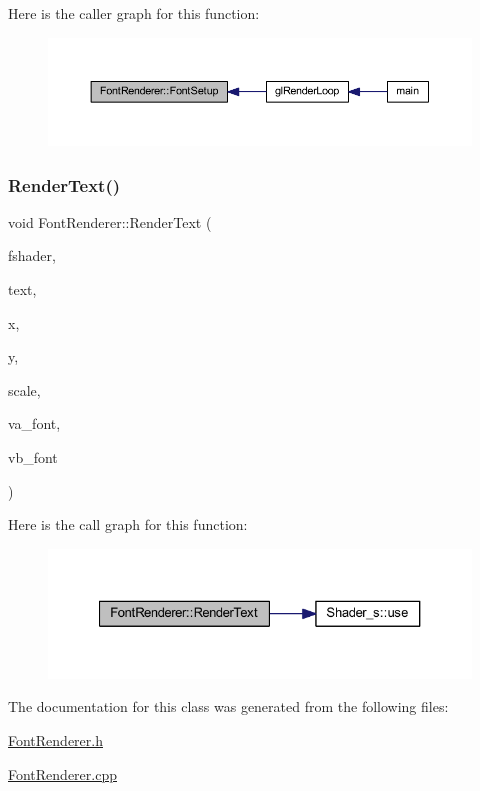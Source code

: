Here is the caller graph for this function\+:
\nopagebreak
\begin{figure}[H]
\begin{center}
\leavevmode
\includegraphics[width=350pt]{class_font_renderer_aa53dc1273b15862d310a4bc66817a5d5_icgraph}
\end{center}
\end{figure}
\mbox{\label{class_font_renderer_adaedb69de45aa987661d83539b0d4ed8}} 
\subsubsection{\texorpdfstring{Render\+Text()}{RenderText()}}
{\footnotesize\ttfamily void Font\+Renderer\+::\+Render\+Text (\begin{DoxyParamCaption}\item[{\mbox{\hyperlink{class_shader__s}{Shader\+\_\+s}}}]{fshader,  }\item[{std\+::string}]{text,  }\item[{G\+Lfloat}]{x,  }\item[{G\+Lfloat}]{y,  }\item[{G\+Lfloat}]{scale,  }\item[{G\+Luint}]{va\+\_\+font,  }\item[{G\+Luint}]{vb\+\_\+font }\end{DoxyParamCaption})}

Here is the call graph for this function\+:
\nopagebreak
\begin{figure}[H]
\begin{center}
\leavevmode
\includegraphics[width=327pt]{class_font_renderer_adaedb69de45aa987661d83539b0d4ed8_cgraph}
\end{center}
\end{figure}


The documentation for this class was generated from the following files\+:\begin{DoxyCompactItemize}
\item 
\mbox{\hyperlink{_font_renderer_8h}{Font\+Renderer.\+h}}\item 
\mbox{\hyperlink{_font_renderer_8cpp}{Font\+Renderer.\+cpp}}\end{DoxyCompactItemize}

